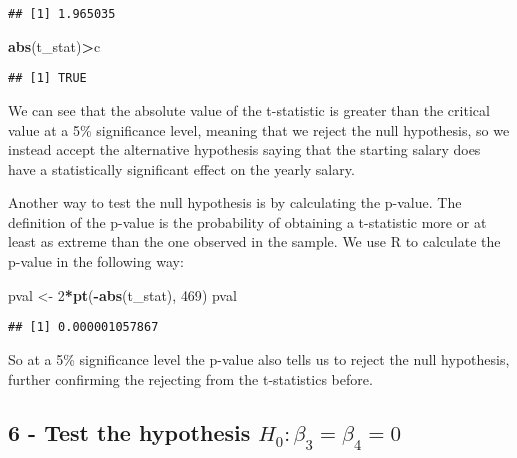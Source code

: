 \documentclass[
]{article}
\newenvironment{Shaded}{\begin{snugshade}}{\end{snugshade}}
\newcommand{\DecValTok}[1]{\textcolor[rgb]{0.00,0.00,0.81}{#1}}
\newcommand{\FunctionTok}[1]{\textcolor[rgb]{0.13,0.29,0.53}{\textbf{#1}}}
\newcommand{\NormalTok}[1]{#1}
\newcommand{\OtherTok}[1]{\textcolor[rgb]{0.56,0.35,0.01}{#1}}
\newcommand{\SpecialCharTok}[1]{\textcolor[rgb]{0.81,0.36,0.00}{\textbf{#1}}}
\begin{document}
\begin{verbatim}
## [1] 1.965035
\end{verbatim}

\begin{Shaded}
\begin{Highlighting}[]
\FunctionTok{abs}\NormalTok{(t\_stat)}\SpecialCharTok{\textgreater{}}\NormalTok{c}
\end{Highlighting}
\end{Shaded}

\begin{verbatim}
## [1] TRUE
\end{verbatim}

We can see that the absolute value of the t-statistic is greater than
the critical value at a 5\% significance level, meaning that we reject
the null hypothesis, so we instead accept the alternative hypothesis
saying that the starting salary does have a statistically significant
effect on the yearly salary.

Another way to test the null hypothesis is by calculating the p-value.
The definition of the p-value is the probability of obtaining a
t-statistic more or at least as extreme than the one observed in the
sample. We use R to calculate the p-value in the following way:

\begin{Shaded}
\begin{Highlighting}[]
\NormalTok{pval }\OtherTok{\textless{}{-}} \DecValTok{2}\SpecialCharTok{*}\FunctionTok{pt}\NormalTok{(}\SpecialCharTok{{-}}\FunctionTok{abs}\NormalTok{(t\_stat), }\DecValTok{469}\NormalTok{)}
\NormalTok{pval}
\end{Highlighting}
\end{Shaded}

\begin{verbatim}
## [1] 0.000001057867
\end{verbatim}

So at a 5\% significance level the p-value also tells us to reject the
null hypothesis, further confirming the rejecting from the t-statistics
before.

\subsection{\texorpdfstring{6 - Test the hypothesis
\(H_0: \beta_3 = \beta_4 = 0\)}{6 - Test the hypothesis H\_0: \textbackslash beta\_3 = \textbackslash beta\_4 = 0}}\label{test-the-hypothesis-h_0-beta_3-beta_4-0}
\end{document}
